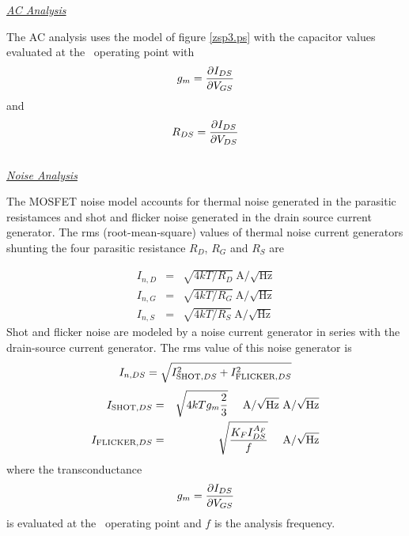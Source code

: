 \noindent\underline{\sl \large AC Analysis}\\[0.1in]

The AC analysis uses the model of figure  \ref{zsp3.ps} with the capacitor values
evaluated at the \dc\ operating point with
\begin{equation}
g_m = {{\textstyle\partial I_{DS}} \over {\textstyle\partial V_{GS}}}
\end{equation}
and
\begin{equation}
R_{DS} = {{\textstyle\partial I_{DS}} \over {\textstyle\partial V_{DS}}}
\end{equation}\\[0.1in]
\noindent\underline{\sl \large Noise Analysis}\\[0.1in]

The MOSFET noise model accounts for thermal noise generated in the
parasitic resistamces and shot and flicker noise generated in the
drain source current generator.  The rms (root-mean-square) values of
thermal noise current generators shunting the four parasitic resistance
$R_D$, $R_G$ and $R_S$ are

\begin{eqnarray}
I_{n,D} &=& \sqrt{4kT/R_D}~\mbox{A/}\sqrt{\mbox{Hz}}\\
I_{n,G} &=& \sqrt{4kT/R_G}~\mbox{A/}\sqrt{\mbox{Hz}}\\
I_{n,S} &=& \sqrt{4kT/R_S}~\mbox{A/}\sqrt{\mbox{Hz}}
\end{eqnarray}
Shot and flicker noise are modeled by
a noise current generator in series with the drain-source current generator.
The rms value of this noise generator is
\begin{equation}
I_{n,DS} = \sqrt{I_{\mbox{\scriptsize SHOT},DS}^2 + I_{\mbox{\scriptsize FLICKER},DS}^2}
\end{equation}
\begin{eqnarray}
I_{\mbox{\scriptsize SHOT},DS} &=& \sqrt{4kTg_m\frac{2}{3}} ~~~~\mbox{A/}\sqrt{\mbox{Hz}}
~\mbox{A/}\sqrt{\mbox{Hz}}\\
I_{\mbox{\scriptsize FLICKER},DS} &=& \sqrt{{{\textstyle K_F I_{DS}^{A_F}}
                         \over {\textstyle f }}}
~~~~\mbox{A/}\sqrt{\mbox{Hz}}
\end{eqnarray}
where the transconductance
\begin{equation}
g_m = {{\textstyle\partial I_{DS}} \over {\textstyle\partial V_{GS}}}
\end{equation}
is evaluated at the \dc\ operating point and $f$ is the analysis frequency.
